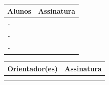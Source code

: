 \documentclass[
	hidelinks,
	12pt,				%
	openright,			%
	oneside,			%
	a4paper,			%
	english,			%
	french,				%
	spanish,			%
	brazil,				%
]{abntex2}
\newcommand{\imprimirorient}{\oorient}
\newcommand{\imprimircoorient}{\ocoorient}
\newcommand{\imprimirautorA}{\oautorA}
\newcommand{\imprimirprontuarioA}{\oprontuarioA}
\newcommand{\imprimirautorB}{\oautorB}
\newcommand{\imprimirprontuarioB}{\oprontuarioB}
\newcommand{\imprimirautorC}{\oautorC}
\newcommand{\imprimirprontuarioC}{\oprontuarioC}
\begin{document}

\vspace{1cm}

\begin{center}
	\begin{tabular}{|m{10cm}|m{5cm}|}
		\hline
		\textbf{Alunos} & \textbf{Assinatura} \\
		\hline
		 \textit{\imprimirprontuarioA - \imprimirautorA} &  \\
		\hline
		\textit{\imprimirprontuarioB - \imprimirautorB} &  \\
		\hline
		\textit{\imprimirprontuarioC - \imprimirautorC} & \\
		\hline
	\end{tabular}
\end{center}

\vspace{0.5cm}

\begin{center}
	\begin{tabular}{|m{10cm}|m{5cm}|}
		\hline
		\textbf{Orientador(es)} & \textbf{Assinatura} \\
		\hline
		\textit{\imprimirorient} & \\
		\hline
		\textit{\imprimircoorient} & \\
		\hline
	\end{tabular}
\end{center}
\end{document}
